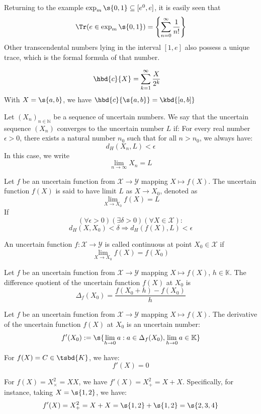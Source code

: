 \begin{example}
	Returning to the example $\exp_m\s{0,1} \subseteq [e^0,e]$, it is easily seen that
	$$\Tr(e \in \exp_m\s{0,1}) = \left\{\sum_{n=0}^{\infty}\frac{1}{n!}\right\} $$
	Other transcendental numbers lying in the interval $[1,e]$ also possess a unique trace, which is the formal formula of that number.
\end{example}
\begin{example}
	$$\hbd{c}{X} = \sum_{k=1}^{\infty} \frac{X}{2^k} \quad$$
	With $X=\s{a,b}$, we have $\hbd{c}{\s{a,b}} = \kbd{[a,b]}$
\end{example}
\begin{definition}
	Let $(X_n)_{n \in \mathbb{N}}$ be a sequence of uncertain numbers.
	We say that the uncertain sequence $(X_n)$ converges to the uncertain number $L$ if:
	For every real number $\epsilon > 0$, there exists a natural number $n_0$ such that for all $n > n_0$, we always have:$$d_H(X_n, L) < \epsilon$$
	In this case, we write \[\lim_{n \to \infty} X_n = L\]
\end{definition}
\begin{definition}
	Let $f$ be an uncertain function from $\mathcal{X} \rightarrow \mathcal{Y}$ mapping $X \mapsto f(X)$. The uncertain function $f(X)$ is said to have limit $L$ as $X \rightarrow X_0$, denoted as $$\lim\limits_{X \rightarrow X_0}f(X) = L$$
	If $$(\forall \epsilon >0)(\exists \delta >0)(\forall X \in \mathcal{X}) : $$ $$ d_H(X,X_0)<\delta \Rightarrow d_H(f(X),L) < \epsilon$$
\end{definition}
\begin{definition}
	An uncertain function $f : \mathcal{X} \to \mathcal{Y}$ is called continuous at point $X_0 \in \mathcal{X}$ if $$\lim\limits_{X \rightarrow X_0}f(X) = f(X_0)$$
\end{definition}
\begin{definition}
	Let $f$ be an uncertain function from $\mathcal{X} \rightarrow \mathcal{Y}$ mapping $X \mapsto f(X)$, $h \in \mathbb{K}$.
	The difference quotient of the uncertain function $f(X)$ at $X_0$ is \[\Delta_f(X_0)= \frac{f(X_0 + h) - f(X_0)}{h}\]
\end{definition}
\begin{definition}[Derivative]
	Let $f$ be an uncertain function from $\mathcal{X} \rightarrow \mathcal{Y}$ mapping $X \mapsto f(X)$.
	The derivative of the uncertain function $f(X)$ at $X_0$ is an uncertain number: $$f'(X_0) := \s{\lim_{h\rightarrow 0}{a: a \in \Delta_f(X_0) , \lim_{h\rightarrow 0}a \in \mathbb{K}}}$$
\end{definition}
\begin{example}
	For $f(X) = C \in \tsbd{K}$, we have: $$f'(X) = 0$$
\end{example}
\begin{example}
	For $f(X) = X^2_\times = XX $, we have $f'(X) = X^2_+ = X+X$. Specifically, for instance, taking $X = \s{1,2}$, we have:
	$$f'(X) = X^2_+ = X+X = \s{1,2} + \s{1,2} = \s{2,3,4}$$
\end{example}


